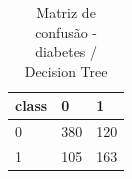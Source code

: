 \begin{table}[htbp]
\centering
\begin{tabular}{lll}
\hline
class & 0 & 1 \\
\hline
0 & 380 & 120 \\
1 & 105 & 163 \\
\hline
\end{tabular}
\caption{Matriz de confusão - diabetes / Decision Tree}
\label{tab:ex3-diabetes-decision-tree-cm}
\end{table}